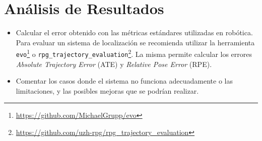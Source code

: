 \documentclass[tp]{lcc}
\begin{document}
	
	\section{Análisis de Resultados}
		\begin{itemize}
			\item Calcular el error obtenido con las métricas estándares utilizadas en robótica. Para evaluar un sistema de localización se recomienda utilizar la herramienta \lstinline{evo}\footnote{\url{https://github.com/MichaelGrupp/evo}} o \lstinline{rpg_trajectory_evaluation}\footnote{\url{https://github.com/uzh-rpg/rpg_trajectory_evaluation}}. La misma permite calcular los errores \emph{Absolute Trajectory Error} (ATE) y \emph{Relative Pose Error} (RPE).
		
			\item Comentar los casos donde el sistema no funciona adecuadamente o las limitaciones, y las posibles mejoras que se podrían realizar.
		\end{itemize}

	\printbibliography
	
\end{document}
